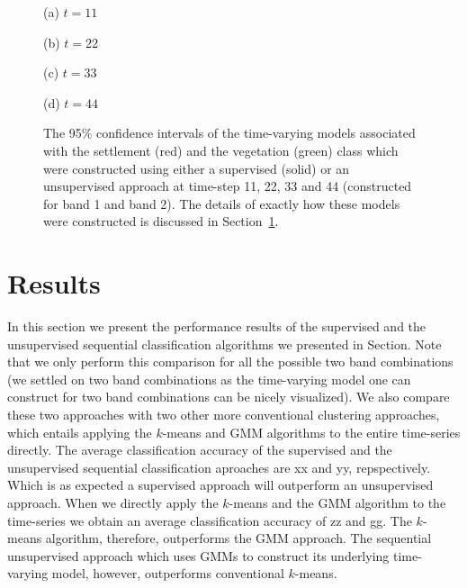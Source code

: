 \documentclass{article}
\begin{document}
\begin{figure}[h!]
\begin{minipage}[b]{.47\linewidth}
  \centering 
  \centerline{}
  \centerline{(a) $t=11$}\medskip
\end{minipage}
\hfill
\begin{minipage}[b]{0.47\linewidth}
  \centering
  \centerline{}
  \centerline{(b) $t=22$}\medskip
\end{minipage}

\begin{minipage}[b]{.47\linewidth}
  \centering 
  \centerline{}
  \centerline{(c) $t=33$}\medskip
\end{minipage}
\hfill
\begin{minipage}[b]{0.47\linewidth}
  \centering
  \centerline{}
  \centerline{(d) $t=44$}\medskip
\end{minipage}
\caption{The 95\% confidence intervals of the time-varying models associated with the settlement (red) and the vegetation (green) class which were constructed using either a supervised (solid) or an unsupervised approach at time-step 11, 22, 33 and 44 (constructed 
for band 1 and band 2). The details of exactly how these models were constructed is discussed in Section~\ref{}.}
\label{fig:time_vary_model}
\end{figure}

\section{Results}
In this section we present the performance results of the supervised and the unsupervised sequential classification algorithms we presented in Section.
Note that we only perform this comparison for all the possible two band combinations (we settled on two band combinations as the time-varying model 
one can construct for two band combinations can be nicely visualized). We also compare these two approaches with two other more conventional clustering approaches, which entails applying the $k$-means and GMM algorithms to the entire time-series directly.
The average classification accuracy of the supervised and the unsupervised sequential classification aproaches are xx and yy, repspectively. Which is 
as expected a supervised approach will outperform an unsupervised approach. When we directly apply the $k$-means and the GMM algorithm to the time-series we obtain 
an average classification accuracy of zz and gg. The $k$-means algorithm, therefore, outperforms the GMM approach. The sequential unsupervised approach which uses 
GMMs to construct its underlying time-varying model, however, outperforms conventional $k$-means. 
\end{document}
